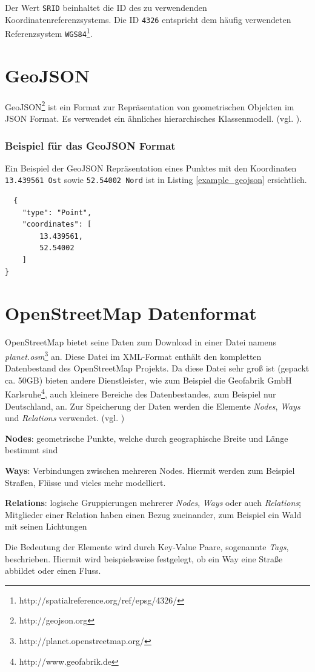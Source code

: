 Der Wert \texttt{SRID} beinhaltet die ID des zu verwendenden Koordinatenreferenzsystems.
Die ID \texttt{4326} entspricht dem häufig verwendeten Referenzsystem \texttt{WGS84}\footnote{http://spatialreference.org/ref/epsg/4326/}.  

\section{GeoJSON}
\label{sec:appendix:geojson}
GeoJSON\footnote{http://geojson.org} ist ein Format zur Repräsentation von geometrischen Objekten im JSON Format.
Es verwendet ein ähnliches hierarchisches Klassenmodell. (vgl. \cite{WEB:GEOJSON:Spec:2008}).

\subsubsection{Beispiel für das GeoJSON Format}
Ein Beispiel der GeoJSON Repräsentation eines Punktes mit den Koordinaten \texttt{13.439561 Ost} sowie \texttt{52.54002 Nord} ist in Listing \ref{example_geojson} ersichtlich.
\lstset{
  numbers=none,
  caption=Beispiel eines geometrischen Punktes in GeoJSON Repräsentation,
  label=example_geojson
}
\begin{lstlisting}
  {
    "type": "Point",
    "coordinates": [
        13.439561,
        52.54002
    ]
}
\end{lstlisting}

\section{OpenStreetMap Datenformat}
\label{sec:appendix:osm:data}
OpenStreetMap bietet seine Daten zum Download in einer Datei namens \textit{planet.osm}\footnote{http://planet.openstreetmap.org/} an. Diese Datei im XML-Format enthält den kompletten Datenbestand des OpenStreetMap Projekts. 
Da diese Datei sehr groß ist (gepackt ca. 50GB) bieten andere Dienstleister, wie zum Beispiel die Geofabrik GmbH Karlsruhe\footnote{http://www.geofabrik.de}, auch kleinere Bereiche des Datenbestandes, zum Beispiel nur Deutschland, an.
Zur Speicherung der Daten werden die Elemente \textit{Nodes}, \textit{Ways} und \textit{Relations} verwendet. (vgl. \cite{WEB:OSM:Primitives:2015})
\begin{compactitem}
  \item \textbf{Nodes}: geometrische Punkte, welche durch geographische Breite und Länge bestimmt sind
  \item \textbf{Ways}: Verbindungen zwischen mehreren Nodes. Hiermit werden zum Beispiel Straßen, Flüsse und vieles mehr modelliert.
  \item \textbf{Relations}: logische Gruppierungen mehrerer \textit{Nodes}, \textit{Ways} oder auch \textit{Relations}; Mitglieder einer Relation haben einen Bezug zueinander, zum Beispiel ein Wald mit seinen Lichtungen 
\end{compactitem}
Die Bedeutung der Elemente wird durch Key-Value Paare, sogenannte \textit{Tags}, beschrieben.
Hiermit wird beispielsweise festgelegt, ob ein Way eine Straße abbildet oder einen Fluss.

